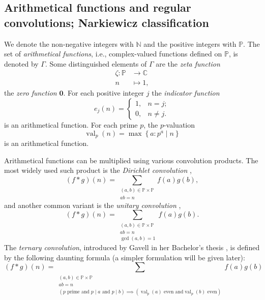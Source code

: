 \documentclass[12pt]{article}
\theoremstyle{definition}
\theoremstyle{remark}
\theoremstyle{plain}
\newcommand\setsuchas[2]{\left\{{#1}:{#2}\right\}}
\newcommand{\NN}{{\mathbb{N}}}
\newcommand{\NNp}{{\mathbb{P}}}
\newcommand{\CC}{{\mathbb{C}}}
\newcommand{\val}{\operatorname{val}}
\newcommand{\divides}[2]{#1 \mid #2}
\begin{document}
\subsection{Arithmetical functions and regular convolutions; Narkiewicz classification}
\label{sec:org5cc9cc8}
We denote the non-negative integers with \(\NN\) and the positive integers with \(\NNp\).
The set of \emph{arithmetical functions}, i.e., complex-valued functions defined on \(\NNp\),
is denoted by \(\Gamma\).
Some distinguished elements of \(\Gamma\) are
the \emph{zeta function}
\begin{equation}
\label{eq:orgb700fb9}
  \begin{split}
     \zeta : \NNp & \to \CC \\ 
     n & \mapsto 1,    
  \end{split}
\end{equation}
the \emph{zero function}
\(\mathbf{0}\). For each positive integer \(j\) the
\emph{indicator function}
\begin{equation}
\label{eq:org0e7e65f}
e_{j}(n) =
\begin{cases}
1, & n = j; \\
0, & n \neq j.
\end{cases}
\end{equation}
is an arithmetical function. For each prime \(p\), the \(p\)-valuation
\begin{equation}
\label{eq:org109925e}
\val_{p}(n) = \max \setsuchas{a}{\divides{p^{a}}{n}}
\end{equation}
is an arithmetical function.

Arithmetical functions can be multiplied using various convolution products.
The most widely used such product is the \emph{Dirichlet convolution} \cite{vaidy,Afunc},
\begin{equation}
\label{eq:orgeb87452}
(f * g) (n) = \sum_{\substack{(a,b) \in \NNp \times \NNp \\ ab = n}} f(a)g(b) ,
\end{equation}
and another common variant is the \emph{unitary convolution}
\cite{Schinzel:Property,UniDiv,UniProd,Snellman:UniDivTop,Snellman:UniTrunc},
\begin{equation}
\label{eq:org182c43e}
(f * g) (n) = \sum_{\substack{(a,b) \in \NNp \times \NNp \\ab = n \\ \gcd(a,b)=1}} f(a)g(b).
\end{equation}
The \emph{ternary convolution}, introduced by Gavell in her Bachelor's thesis \cite{Gavell:Regular}, is defined
by the following daunting formula (a simpler formulation will be given later):
\begin{equation}
\label{eq:org9b5b66e}
  (f * g) (n) =
  \sum_{\substack{
    (a,b) \in \NNp \times \NNp \\
    ab = n \\
    \left(p \text{ prime and } \divides{p}{a} \text{ and } \divides{p}{b}\right) \implies \left( \val_p(a) \text{ even and} \val_p(b) \text{ even} \right)}}
  f(a)g(b)
\end{equation}
\end{document}
